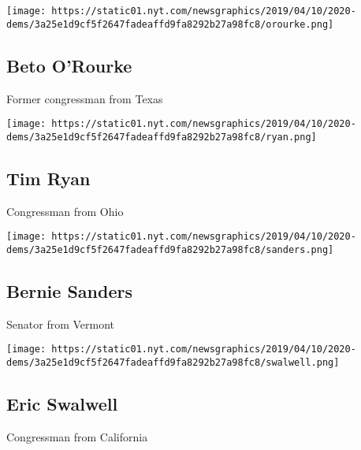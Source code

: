 \href{https://www.nytimes.com/interactive/2019/us/politics/beto-o-rourke-2020-campaign.html}{}

\texttt{[image: https://static01.nyt.com/newsgraphics/2019/04/10/2020-dems/3a25e1d9cf5f2647fadeaffd9fa8292b27a98fc8/orourke.png]}

\hypertarget{beto-orourke}{%
\subsection{Beto O'Rourke}\label{beto-orourke}}

Former congressman from Texas

\href{https://www.nytimes.com/interactive/2019/us/politics/tim-ryan-2020-campaign.html}{}

\texttt{[image: https://static01.nyt.com/newsgraphics/2019/04/10/2020-dems/3a25e1d9cf5f2647fadeaffd9fa8292b27a98fc8/ryan.png]}

\hypertarget{tim-ryan}{%
\subsection{Tim Ryan}\label{tim-ryan}}

Congressman from Ohio

\href{https://www.nytimes.com/interactive/2019/us/politics/bernie-sanders-2020-campaign.html}{}

\texttt{[image: https://static01.nyt.com/newsgraphics/2019/04/10/2020-dems/3a25e1d9cf5f2647fadeaffd9fa8292b27a98fc8/sanders.png]}

\hypertarget{bernie-sanders}{%
\subsection{Bernie Sanders}\label{bernie-sanders}}

Senator from Vermont

\href{https://www.nytimes.com/interactive/2019/us/politics/eric-swalwell-2020-campaign.html}{}

\texttt{[image: https://static01.nyt.com/newsgraphics/2019/04/10/2020-dems/3a25e1d9cf5f2647fadeaffd9fa8292b27a98fc8/swalwell.png]}

\hypertarget{eric-swalwell}{%
\subsection{Eric Swalwell}\label{eric-swalwell}}

Congressman from California

\href{https://www.nytimes.com/interactive/2019/us/politics/elizabeth-warren-2020-campaign.html}{}

